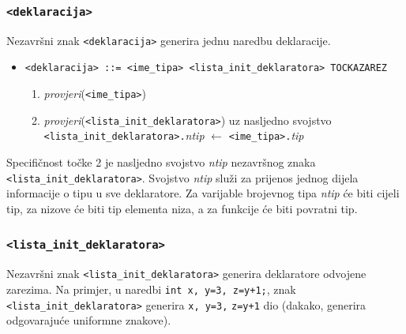\documentclass[times, 12pt, utf8]{book}
\begin{document}
\subsubsection{\texttt{<deklaracija>}}

Nezavršni znak \verb|<deklaracija>| generira jednu naredbu deklaracije.

\begin{itemize}

\item
\verb|<deklaracija> ::= <ime_tipa> <lista_init_deklaratora> TOCKAZAREZ|
\begin{enumerate}
\item
\emph{provjeri}(\verb|<ime_tipa>|)
\item
\emph{provjeri}(\verb|<lista_init_deklaratora>|) uz nasljedno svojstvo\\
\verb|<lista_init_deklaratora>.|\emph{ntip} \(\leftarrow\) \verb|<ime_tipa>.|\emph{tip}
\end{enumerate}

\end{itemize}

Specifičnost točke 2 je nasljedno svojstvo \emph{ntip} nezavršnog znaka \verb|<lista_init_deklaratora>|.
Svojstvo \emph{ntip} služi za prijenos jednog dijela informacije o tipu u sve deklaratore.
Za varijable brojevnog tipa \emph{ntip} će biti cijeli tip, za nizove će biti tip elementa niza, a za funkcije će biti povratni tip.

\subsubsection{\texttt{<lista\_init\_deklaratora>}}

Nezavršni znak \verb|<lista_init_deklaratora>| generira deklaratore odvojene zarezima.
Na primjer, u naredbi \verb|int x, y=3, z=y+1;|, znak \verb|<lista_init_deklaratora>| generira \verb|x, y=3,| \verb|z=y+1| dio (dakako, generira odgovarajuće uniformne znakove).
\end{document}
